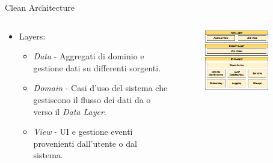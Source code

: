     \begin{frame}{Clean Architecture}
        \begin{columns}[onlytextwidth]
            \begin{column}{0.45\textwidth}
            \begin{itemize}
                \item Layers:
                    \begin{itemize}
                        \item \textit{Data} - Aggregati di dominio e gestione dati su differenti sorgenti.
                        \item \textit{Domain} - Casi d’uso del sistema che gestiscono il flusso dei dati da o verso il \textit{Data Layer}.
                        \item \textit{View} - UI e gestione eventi provenienti dall’utente o dal sistema.
                    \end{itemize}
                \end{itemize}
            \end{column}
            \begin{column}{0.55\textwidth}
                \begin{figure}[H]
                \centering
                \includegraphics[width=0.8\textwidth]{img/tesi-2-Page-18.drawio.png}
                \end{figure}
            \end{column}
        \end{columns}
    \end{frame}